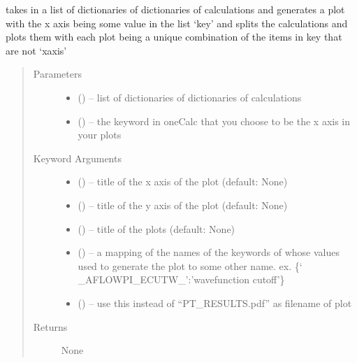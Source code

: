 \documentclass[letterpaper,10pt,english]{sphinxmanual}
\begin{document}
\begin{fulllineitems}
\label{\detokenize{pseudo:pseudo.plot}}
takes in a list of dictionaries of dictionaries of calculations and generates
a plot with the x axis being some value in the list `key' and splits the calculations
and plots them with each plot being a unique combination of the items in key that are not
`xaxis'
\begin{quote}\begin{description}
\item[{Parameters}] \leavevmode\begin{itemize}
\item {} 
 () -- list of dictionaries of dictionaries of calculations

\item {} 
 () -- the keyword in oneCalc that you choose to be the x axis in your plots

\end{itemize}

\item[{Keyword Arguments}] \leavevmode\begin{itemize}
\item {} 
 () -- title of the x axis of the plot (default: None)

\item {} 
 () -- title of the y axis of the plot (default: None)

\item {} 
 () -- title of the plots (default: None)

\item {} 
 () -- a mapping of the names of the keywords of whose
values used to generate the plot to some other name.
ex. \{` \_AFLOWPI\_ECUTW\_':'wavefunction cutoff'\}

\item {} 
 () -- use this instead of ``PT\_RESULTS.pdf'' as filename of plot

\end{itemize}

\item[{Returns}] \leavevmode
None

\end{description}\end{quote}

\end{fulllineitems}
\end{document}
